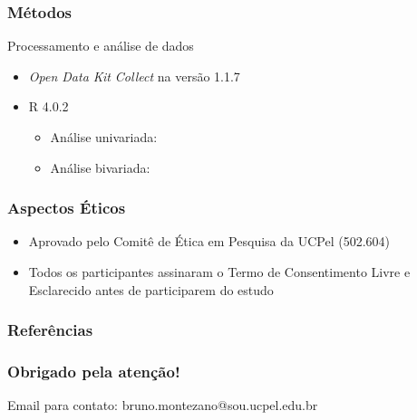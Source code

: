 \documentclass{beamer}
\begin{document}
\begin{frame}
\frametitle{Métodos}

    \begin{block}{Processamento e análise de dados}
        \begin{itemize}
            \item \emph{Open Data Kit Collect} na versão 1.1.7       
            \item R 4.0.2
            \begin{itemize}
                \item Análise univariada:
                \item Análise bivariada: 
            \end{itemize}
        \end{itemize}
    \end{block}

\end{frame}

\begin{frame}
\frametitle{Aspectos Éticos}

    \Large
    \begin{itemize}
        \item Aprovado pelo Comitê de Ética em Pesquisa da UCPel (502.604)
        \item Todos os participantes assinaram o Termo de Consentimento Livre e Esclarecido antes de participarem do estudo
    \end{itemize}

\end{frame}

\begin{frame}[shrink=20]
\frametitle{Referências}

\printbibliography

\end{frame}

\begin{frame}
\frametitle{Obrigado pela atenção!}

    \begin{block}{Email para contato:}
        bruno.montezano@sou.ucpel.edu.br
    \end{block}

\end{frame}
\end{document}
